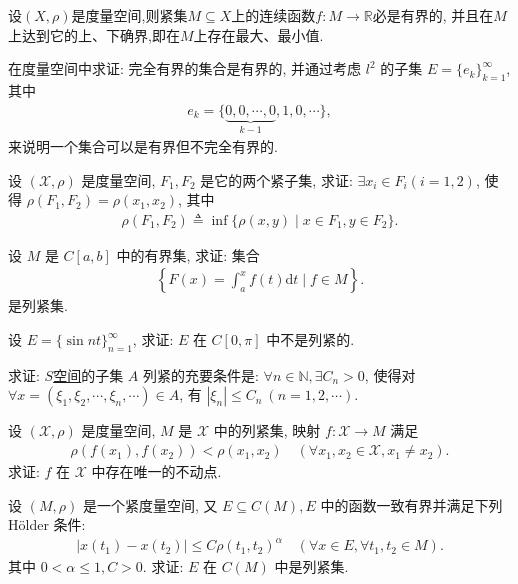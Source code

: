 \documentclass[../../main.tex]{subfiles}%
\begin{document}
\begin{proposition}
设$(X,\rho)$是度量空间,则紧集$M\subseteq X$上的连续函数$f:M\to \mathbb{R}$必是有界的, 并且在$M$上达到它的上、下确界,即在$M$上存在最大、最小值.
\end{proposition}

\begin{example}
在度量空间中求证: 完全有界的集合是有界的, 并通过考虑 $l^2$ 的子集 $E = \{e_k\}_{k=1}^\infty$, 其中
\begin{align*}
e_k = \{\underbrace{0,0,\cdots,0}_{k-1},1,0,\cdots\},
\end{align*}
来说明一个集合可以是有界但不完全有界的.
\end{example}

\begin{example}
设 $(\mathscr{X},\rho)$ 是度量空间, $F_1,F_2$ 是它的两个紧子集, 求证: $\exists x_i \in F_i(i=1,2)$, 使得 $\rho(F_1,F_2) = \rho(x_1,x_2)$, 其中
\begin{align*}
\rho(F_1,F_2) \triangleq \inf\limits\{\rho(x,y) \mid x \in F_1, y \in F_2\}.
\end{align*}
\end{example}

\begin{example}
设 $M$ 是 $C[a,b]$ 中的有界集, 求证: 集合
\begin{align*}
\left\{F(x) = \int_a^x f(t)\mathrm{d}t \mid f \in M\right\}.
\end{align*}
是列紧集.
\end{example}

\begin{example}
设 $E = \{\sin nt\}_{n=1}^\infty$, 求证: $E$ 在 $C[0,\pi]$ 中不是列紧的.
\end{example}

\begin{example}
求证: \hyperref[proposition:空间S是完备度量空间]{$S$空间}的子集 $A$ 列紧的充要条件是: $\forall n \in \mathbb{N}, \exists C_n > 0$, 使得对 $\forall x = (\xi_1,\xi_2,\cdots,\xi_n,\cdots) \in A$, 有 $|\xi_n| \leqslant C_n\ (n=1,2,\cdots)$.
\end{example}

\begin{example}
设 $(\mathscr{X},\rho)$ 是度量空间, $M$ 是 $\mathscr{X}$ 中的列紧集, 映射 $f: \mathscr{X} \to M$ 满足
\begin{align*}
\rho(f(x_1),f(x_2)) < \rho(x_1,x_2) \quad (\forall x_1,x_2 \in \mathscr{X}, x_1 \neq x_2).
\end{align*}
求证: $f$ 在 $\mathscr{X}$ 中存在唯一的不动点.
\end{example}

\begin{example}
设 $(M,\rho)$ 是一个紧度量空间, 又 $E \subseteq C(M), E$ 中的函数一致有界并满足下列 Hölder 条件:
\begin{align*}
|x(t_1) - x(t_2)| \leqslant C\rho(t_1,t_2)^\alpha \quad (\forall x \in E, \forall t_1,t_2 \in M).
\end{align*}
其中 $0 < \alpha \leqslant 1, C > 0$. 求证: $E$ 在 $C(M)$ 中是列紧集.
\end{example}
\end{document}
